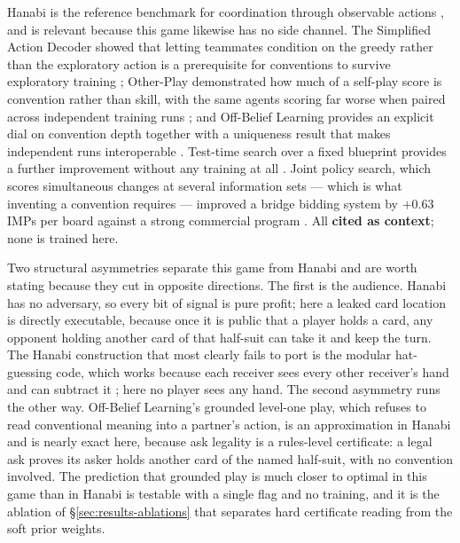 Hanabi is the reference benchmark for coordination through observable actions
\cite{bard-hanabi}, and is relevant because this game likewise has no side
channel. The Simplified Action Decoder showed that letting teammates condition
on the greedy rather than the exploratory action is a prerequisite for
conventions to survive exploratory training \cite{hu-sad}; Other-Play
demonstrated how much of a self-play score is convention rather than skill, with
the same agents scoring far worse when paired across independent training runs
\cite{hu-otherplay}; and Off-Belief Learning provides an explicit dial on
convention depth together with a uniqueness result that makes independent runs
interoperable \cite{hu2021obl}. Test-time search over a fixed blueprint provides
a further improvement without any training at all \cite{lerer2020sparta}. Joint
policy search, which scores simultaneous changes at several information sets ---
which is what inventing a convention requires --- improved a bridge bidding
system by $+0.63$ IMPs per board against a strong commercial program
\cite{tian2020jps}. All \textbf{cited as context}; none is trained here.

Two structural asymmetries separate this game from Hanabi and are worth stating
because they cut in opposite directions. The first is the audience. Hanabi has
no adversary, so every bit of signal is pure profit; here a leaked card location
is directly executable, because once it is public that a player holds a card,
any opponent holding another card of that half-suit can take it and keep the
turn. The Hanabi construction that most clearly fails to port is the modular
hat-guessing code, which works because each receiver sees every other receiver's
hand and can subtract it \cite{cox-hanabi}; here no player sees any hand. The
second asymmetry runs the other way. Off-Belief Learning's grounded level-one
play, which refuses to read conventional meaning into a partner's action, is an
approximation in Hanabi and is nearly exact here, because ask legality is a
rules-level certificate: a legal ask proves its asker holds another card of the
named half-suit, with no convention involved. The prediction that grounded play
is much closer to optimal in this game than in Hanabi is testable with a single
flag and no training, and it is the ablation of \S\ref{sec:results-ablations}
that separates hard certificate reading from the soft prior weights.


